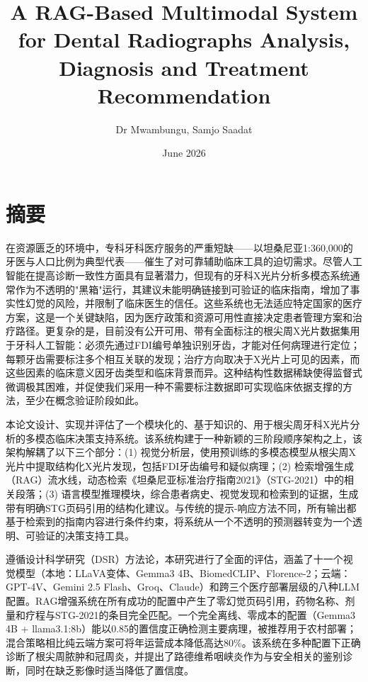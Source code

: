 \documentclass[12pt,a4paper]{report}
\title {A RAG-Based Multimodal System for Dental Radiographs Analysis, Diagnosis and Treatment Recommendation}
\author{Dr Mwambungu, Samjo Saadat}
\date{June 2026}
\begin{document}


	\chapter*{摘要}
	
	在资源匮乏的环境中，专科牙科医疗服务的严重短缺——以坦桑尼亚1:360,000的牙医与人口比例为典型代表——催生了对可靠辅助临床工具的迫切需求。尽管人工智能在提高诊断一致性方面具有显著潜力，但现有的牙科X光片分析多模态系统通常作为不透明的"黑箱"运行，其建议未能明确链接到可验证的临床指南，增加了事实性幻觉的风险，并限制了临床医生的信任。这些系统也无法适应特定国家的医疗方案，这是一个关键缺陷，因为医疗政策和资源可用性直接决定患者管理方案和治疗路径。更复杂的是，目前没有公开可用、带有全面标注的根尖周X光片数据集用于牙科人工智能：必须先通过FDI编号单独识别牙齿，才能对任何病理进行定位；每颗牙齿需要标注多个相互关联的发现；治疗方向取决于X光片上可见的因素，而这些因素的临床意义因牙齿类型和临床背景而异。这种结构性数据稀缺使得监督式微调极其困难，并促使我们采用一种不需要标注数据即可实现临床依据支撑的方法，至少在概念验证阶段如此。
	
	本论文设计、实现并评估了一个模块化的、基于知识的、用于根尖周牙科X光片分析的多模态临床决策支持系统。该系统构建于一种新颖的三阶段顺序架构之上，该架构解耦了以下三个部分：(1) 视觉分析层，使用预训练的多模态模型从根尖周X光片中提取结构化X光片发现，包括FDI牙齿编号和疑似病理；(2) 检索增强生成（RAG）流水线，动态检索《坦桑尼亚标准治疗指南2021》（STG-2021）中的相关段落；(3) 语言模型推理模块，综合患者病史、视觉发现和检索到的证据，生成带有明确STG页码引用的结构化建议。与传统的提示-响应方法不同，所有输出都基于检索到的指南内容进行条件约束，将系统从一个不透明的预测器转变为一个透明、可验证的决策支持工具。
	
	遵循设计科学研究（DSR）方法论，本研究进行了全面的评估，涵盖了十一个视觉模型（本地：LLaVA变体、Gemma3 4B、BiomedCLIP、Florence-2；云端：GPT-4V、Gemini 2.5 Flash、Groq、Claude）和跨三个医疗部署层级的八种LLM配置。RAG增强系统在所有成功的配置中产生了零幻觉页码引用，药物名称、剂量和疗程与STG-2021的条目完全匹配。一个完全离线、零成本的配置（Gemma3 4B + llama3.1:8b）能以0.85的置信度正确检测主要病理，被推荐用于农村部署；混合策略相比纯云端方案可将年运营成本降低高达80\%。该系统在多种配置下正确诊断了根尖周脓肿和冠周炎，并提出了路德维希咽峡炎作为与安全相关的鉴别诊断，同时在缺乏影像时适当降低了置信度。
	
\end{document}
